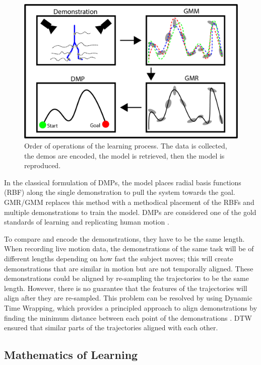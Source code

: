 \begin{figure} 
    \centering 
    \includegraphics[scale=0.25]{images/background/demo_figure.png} 
    \caption[Learning Process]{Order of operations of the learning process. The data is collected, the demos are encoded, the model is retrieved, then the model is reproduced.} 
    \label{fig:demostation} 
\end{figure} 


In the classical formulation of DMPs, the model places radial basis functions (RBF) along the single demonstration to pull the system towards the goal. GMR/GMM replaces this method with a methodical placement of the RBFs and multiple demonstrations to train the model. DMPs are considered one of the gold standards of learning and replicating human motion \cite{nakanishi2004learning}.


To compare and encode the demonstrations, they have to be the same length. When recording live motion data, the demonstrations of the same task will be of different lengths depending on how fast the subject moves; this will create demonstrations that are similar in motion but are not temporally aligned. These demonstrations could be aligned by re-sampling the trajectories to be the same length. However, there is no guarantee that the features of the trajectories will align after they are re-sampled. This problem can be resolved by using Dynamic Time Wrapping, which provides a principled approach to align demonstrations by finding the minimum distance between each point of the demonstrations \cite{JSSv031i07}. DTW ensured that similar parts of the trajectories aligned with each other. 

\subsection{Mathematics of Learning}
 

